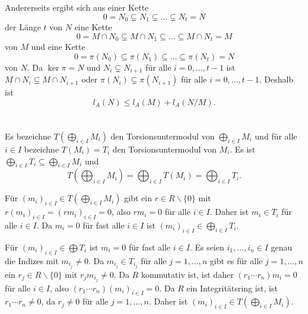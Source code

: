 \documentclass[a4paper,10pt]{article}
\theoremstyle{definition}
\begin{document}
Andererseits ergibt sich aus einer Kette
\[
 0 = N_0 \subsetneq N_1 \subsetneq \ldots \subsetneq N_t = N
\]
der Länge $t$ von $N$ eine Kette
\[
 0 = M \cap N_0 \subsetneq M \cap N_1 \subseteq \ldots \subseteq M \cap N_t = M
\]
von $M$ und eine Kette
\[
 0 = \pi(N_0) \subseteq \pi(N_1) \subseteq \ldots \subseteq \pi(N_t) = N
\]
von $N$. Da $\ker \pi = N$ und $N_i \subsetneq N_{i+1}$ für alle $i=0, \ldots, t-1$ ist $M \cap N_i \subsetneq M \cap N_{i+1}$ oder $\pi(N_i) \subsetneq \pi(N_{i+1})$ für alle $i=0, \ldots, t-1$. Deshalb ist
\[
 l_A(N) \leq l_A(M) + l_A(N/M).
\]





\section{}





\section{}


\subsection{}
Es bezeichne $T(\bigoplus_{i \in I} M_i)$ den Torsionsuntermodul von $\bigoplus_{i \in I} M_i$ und für alle $i \in I$ bezeichne $T(M_i) = T_i$ den Torsionsuntermodul von $M_i$. Es ist $\bigoplus_{i \in I} T_i \subseteq \bigoplus_{i \in I} M_i$ und
\[
 T\left( \bigoplus_{i \in I} M_i \right) = \bigoplus_{i \in I} T(M_i) = \bigoplus_{i \in I} T_i.
\]

Für $(m_i)_{i \in I} \in T\left( \bigoplus_{i \in I} M_i \right)$ gibt ein $r \in R \smallsetminus \{0\}$ mit $r(m_i)_{i \in I} = (rm_{i})_{i \in I} = 0$, also $rm_i = 0$ für alle $i \in I$. Daher ist $m_i \in T_i$ für alle $i \in I$. Da $m_i = 0$ für fast alle $i \in I$ ist $(m_i)_{i \in I} \in \bigoplus_{i \in I} T_i$.

Für $(m_i)_{i \in I} \in \bigoplus T_i$ ist $m_i = 0$ für fast alle $i \in I$. Es seien $i_1, \ldots, i_n \in I$ genau die Indizes mit $m_{i_j} \neq 0$. Da $m_{i_j} \in T_{i_j}$ für alle $j=1,\ldots,n$ gibt es für alle $j=1,\ldots,n$ ein $r_j \in R \smallsetminus \{0\}$ mit $r_j m_{i_j} \neq 0$. Da $R$ kommutativ ist, ist daher $(r_1 \cdots r_n) m_i = 0$ für alle $i \in I$, also $(r_1 \cdots r_n) (m_i)_{i \in I} = 0$. Da $R$ ein Integritätsring ist, ist $r_1 \cdots r_n \neq 0$, da $r_j \neq 0$ für alle $j=1,\ldots,n$. Daher ist $(m_i)_{i \in I} \in T(\bigoplus_{i \in I} M_i)$.
\end{document}

